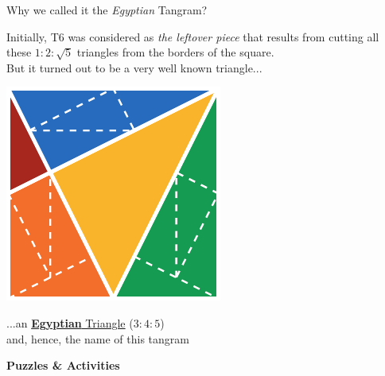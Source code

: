 \documentclass[14pt]{beamer}
\begin{document}
    \begin{frame}{Why we called it the \emph{Egyptian} Tangram?}
        \begin{center}
            {\small Initially, T6 was considered as \emph{the leftover piece} that results from cutting all these $1\!\!:\!\!2\!\!:\!\!\sqrt{5}$ triangles from the borders of the square.\\But it turned out to be a very well known triangle...}

            \bigskip \bigskip

            \includegraphics[height=15ex]{figures/figure003a.pdf} \\

            \bigskip \bigskip

            ...an \href{https://en.wikipedia.org/wiki/Rope_stretcher}{\textbf{Egyptian} Triangle} ($3\!\!:\!\!4\!\!:\!\!5$)\\{\small and, hence, the name of this tangram}
        \end{center}
    \end{frame}


    \begin{frame}{}
        \begin{center}
            \textbf{\Huge Puzzles \& Activities}\\
        \end{center}
    \end{frame}

\end{document}
